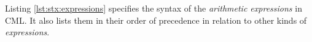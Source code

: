 Listing \ref{lst:stx:expressions} specifies the syntax of
the \emph{arithmetic expressions} in CML.
It also lists them in their order of precedence
in relation to other kinds of \emph{expressions}.
